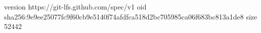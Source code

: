 version https://git-lfs.github.com/spec/v1
oid sha256:9e9ee25077fc9f60cb9e5140f74afdfca518d2bc705985ca06f683bc813a1de8
size 52442
